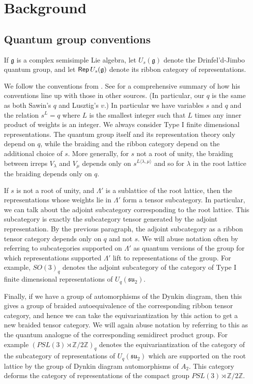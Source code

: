 \documentclass[12pt]{amsart}
\begin{document}
\section{Background}

\subsection{Quantum group conventions}
\label{sec:QGConventions}

If $\mathfrak{g}$ is a complex semisimple Lie algebra, let $U_s(\mathfrak{g})$
denote the Drinfel'd-Jimbo quantum group, and let $\operatorname{\mathsf{Rep}}{U_s(\mathfrak{g})}$
denote its ribbon category of representations.

We follow the conventions from \cite{MR2286123}.  See \cite[p. 2]{MR2286123}
for a comprehensive summary of how his conventions line up with those in other
sources. (In particular, our $q$ is the same as both Sawin's $q$ and Lusztig's
$v$.) In particular we have variables $s$ and $q$ and the relation $s^L = q$
where $L$ is the smallest integer such that $L$ times any inner product of
weights is an integer. We always consider Type I finite dimensional representations.
The quantum group itself and its representation theory
only depend on $q$, while the braiding and the ribbon category depend on the
additional choice of $s$.   More generally, for $s$ not a root of unity,
the braiding between irreps $V_\lambda$ and $V_\mu$ depends only on 
$s^{L\langle \lambda, \mu\rangle}$ and so for $\lambda$ in the
root lattice the braiding depends only on $q$.

If $s$ is not a root of unity, and $\Lambda'$ is a sublattice of the root lattice,
then the representations whose weights lie in $\Lambda'$ form a tensor
subcategory.  In particular, we can talk about the adjoint subcategory
corresponding to the root lattice.  This subcategory is exactly the subcategory
tensor generated by the adjoint representation.  By the previous paragraph,
the adjoint subcategory as a ribbon tensor category depends only on $q$ and not $s$.
We will abuse notation often by referring to subcategories supported on $\Lambda'$
as quantum versions of the group for which representations supported $\Lambda'$ lift
to representations of the group.   For example, $SO(3)_q$ denotes the adjoint subcategory
of the category of Type I finite dimensional representations of $U_q(\mathfrak{su}_2)$.

Finally, if we have a group of automorphisms of the Dynkin diagram,
then this gives a group of braided autoequivalence of the corresponding
ribbon tensor category, and hence we can take the equivariantization by this
action to get a new braided tensor category.  We will again abuse notation
by referring to this as the quantum analogue of the corresponding semidirect
product group.  For example $(PSL(3) \rtimes \mathbb{Z}/2\mathbb{Z})_q$ denotes the
equivariantization \cite[\S2.7]{MR3242743} of the category of the subcategory  of representations of $U_q(\mathfrak{su}_2)$
which are supported on the root lattice by the group of Dynkin diagram automorphisms of $A_2$.
This category deforms the category of representations of  the compact group 
$PSL(3) \rtimes \mathbb{Z}/2\mathbb{Z}$.
\end{document}
